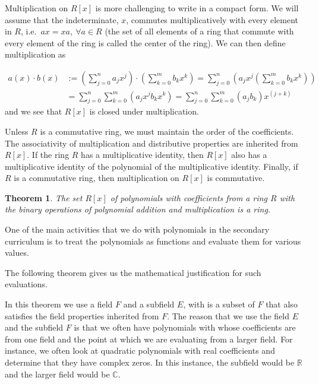 \documentclass[
]{book}
\newtheorem{theorem}{Theorem}[chapter]
\theoremstyle{definition}
\theoremstyle{definition}
\theoremstyle{definition}
\theoremstyle{definition}
\theoremstyle{remark}
\begin{document}
Multiplication on \(R[x]\) is more challenging to write in a compact form. We will assume that the indeterminate, \(x\), commutes multiplicatively with every element in \(R\), i.e.~\(ax=xa, \: \forall a\in R\) (the set of all elements of a ring that commute with every element of the ring is called the center of the ring). We can then define multiplication as

\begin{align*}
    a(x) \cdot b(x) &:= \left( \sum_{j=0}^n a_j x^j \right) \cdot \left(\sum_{k=0}^m b_k x^k\right) 
    = \sum_{j=0}^n \left( a_j x^j \left(\sum_{k=0}^m b_k x^k\right) \right) \\
    &= \sum_{j=0}^n \sum_{k=0}^m \left(a_j x^j b_k x^k\right) 
    = \sum_{j=0}^n \sum_{k=0}^m \left(a_j b_k\right) x^{(j+k)}
\end{align*}
and we see that \(R[x]\) is closed under multiplication.

Unless \(R\) is a commutative ring, we must maintain the order of the coefficients. The associativity of multiplication and distributive properties are inherited from \(R[x]\). If the ring \(R\) has a multiplicative identity, then \(R[x]\) also has a multiplicative identity of the polynomial of the multiplicative identity. Finally, if \(R\) is a commutative ring, then multiplication on \(R[x]\) is commutative.

\begin{theorem}
The set \(R[x]\) of polynomials with coefficients from a ring \(R\) with the binary operations of polynomial addition and multiplication is a ring.
\end{theorem}

One of the main activities that we do with polynomials in the secondary curriculum is to treat the polynomials as functions and evaluate them for various values.

The following theorem gives us the mathematical justification for such evaluations.

In this theorem we use a field \(F\) and a subfield \(E\), with is a subset of \(F\) that also satisfies the field properties inherited from \(F\). The reason that we use the field \(E\) and the subfield \(F\) is that we often have polynomials with whose coefficients are from one field and the point at which we are evaluating from a larger field. For instance, we often look at quadratic polynomials with real coefficients and determine that they have complex zeros. In this instance, the subfield would be \(\mathbb{R}\) and the larger field would be \(\mathbb{C}\).
\end{document}
